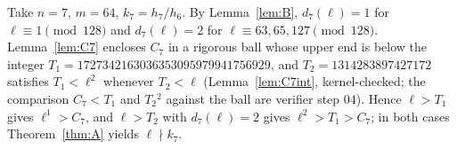 Take $n=7$, $m=64$, $k_7=h_7/h_6$. By Lemma~\ref{lem:B}, $d_7(\ell)=1$ for $\ell\equiv1\pmod{128}$ and $d_7(\ell)=2$ for $\ell\equiv63,65,127\pmod{128}$. Lemma~\ref{lem:C7} encloses $C_7$ in a rigorous ball whose upper end is below the integer $T_1=1727342163036353095979941756929$, and $T_2=1314283897427172$ satisfies $T_1<\ell^2$ whenever $T_2<\ell$ (Lemma~\ref{lem:C7int}, kernel-checked; the comparison $C_7<T_1$ and $T_2{}^2$ against the ball are verifier step 04). Hence $\ell>T_1$ gives $\ell^{1}>C_7$, and $\ell>T_2$ with $d_7(\ell)=2$ gives $\ell^2>T_1>C_7$; in both cases Theorem~\ref{thm:A} yields $\ell\nmid k_7$.
